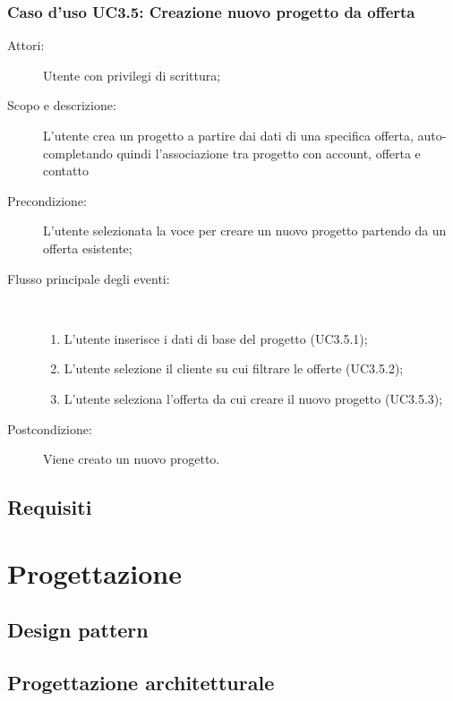 \documentclass[12pt,a4paper,twoside,openright,english]{book}
\begin{document}
\subsection{Caso d'uso UC3.5: Creazione nuovo progetto da offerta}\begin{description}
	\item[Attori:] Utente con privilegi di scrittura;
	\item[Scopo e descrizione:] L'utente crea un progetto a partire dai dati di una specifica offerta, auto-completando quindi l'associazione tra progetto con account, offerta e contatto
	\item[Precondizione:] L'utente selezionata la voce per creare un nuovo progetto partendo da un offerta esistente;
	
	\item[Flusso principale degli eventi:] \ 
	\begin{enumerate}
		\item L’utente inserisce i dati di base del progetto  (UC3.5.1);
		\item L’utente selezione il cliente su cui filtrare le offerte  (UC3.5.2);
		\item L’utente seleziona l’offerta da cui creare il nuovo progetto  (UC3.5.3);
		
	\end{enumerate}
	\item[Postcondizione:] Viene creato un nuovo progetto.
\end{description}

\section{Requisiti}\label{requisiti}


\chapter{Progettazione}\label{progettazione}

\section{Design pattern}\label{design_pattern}
\section{Progettazione architetturale}\label{progettazione_architetturale}
\end{document}
